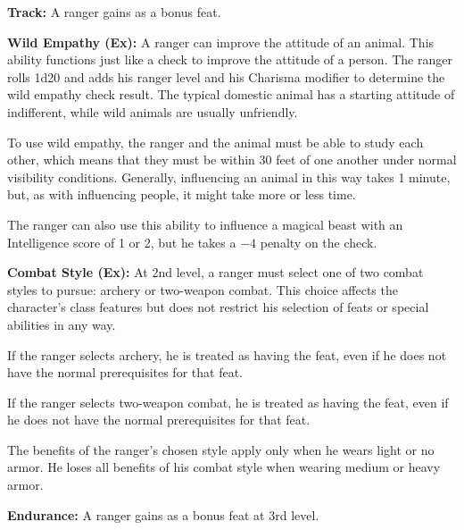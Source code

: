 
\textbf{Track:} A ranger gains  as a bonus feat.

\textbf{Wild Empathy (Ex):} A ranger can improve the attitude of an animal. This ability functions just like a  check to improve the attitude of a person. The ranger rolls 1d20 and adds his ranger level and his Charisma modifier to determine the wild empathy check result. The typical domestic animal has a starting attitude of indifferent, while wild animals are usually unfriendly.

To use wild empathy, the ranger and the animal must be able to study each other, which means that they must be within 30 feet of one another under normal visibility conditions. Generally, influencing an animal in this way takes 1 minute, but, as with influencing people, it might take more or less time.

The ranger can also use this ability to influence a magical beast with an Intelligence score of 1 or 2, but he takes a $-4$ penalty on the check.

\textbf{Combat Style (Ex):} At 2nd level, a ranger must select one of two combat styles to pursue: archery or two-weapon combat. This choice affects the character's class features but does not restrict his selection of feats or special abilities in any way.

If the ranger selects archery, he is treated as having the  feat, even if he does not have the normal prerequisites for that feat.

If the ranger selects two-weapon combat, he is treated as having the  feat, even if he does not have the normal prerequisites for that feat.

The benefits of the ranger's chosen style apply only when he wears light or no armor. He loses all benefits of his combat style when wearing medium or heavy armor.

\textbf{Endurance:} A ranger gains  as a bonus feat at 3rd level.

